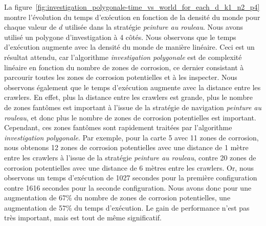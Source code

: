 \documentclass[english,RandD]{rapportPFE}  %
\begin{document}
			La figure~\ref{fig:investigation_polygonale-time_vs_world_for_each_d_k1_n2_p4} montre l'évolution du temps d'exécution en fonction de la densité du monde pour chaque valeur de $d$ utilisée dans la stratégie \textit{peinture au rouleau}.
			Nous avons utilisé un polygone d'investigation à 4 côtés.
			Nous observons que le temps d'exécution augmente avec la densité du monde de manière linéaire.
			Ceci est un résultat attendu, car l'algorithme \textit{investigation polygonale} est de complexité linéaire en fonction du nombre de zones de corrosion, ce dernier consistant à parcourir toutes les zones de corrosion potentielles et à les inspecter.
			Nous observons également que le temps d'exécution augmente avec la distance entre les crawlers.
			En effet, plus la distance entre les crawlers est grande, plus le nombre de zones fantômes est important à l'issue de la stratégie de navigation \textit{peinture au rouleau}, et donc plus le nombre de zones de corrosion potentielles est important.
			Cependant, ces zones fantômes sont rapidement traitées par l'algorithme \textit{investigation polygonale}.
			Par exemple, pour la carte 5 avec 11 zones de corrosion, nous obtenons 12 zones de corrosion potentielles avec une distance de 1 mètre entre les crawlers à l'issue de la stratégie \textit{peinture au rouleau}, contre 20 zones de corrosion potentielles avec une distance de 6 mètres entre les crawlers.
			Or, nous observons un temps d'exécution de 1027 secondes pour la première configuration contre 1616 secondes pour la seconde configuration.
			Nous avons donc pour une augmentation de 67\% du nombre de zones de corrosion potentielles, une augmentation de 57\% du temps d'exécution.
			Le gain de performance n'est pas très important, mais est tout de même significatif.
\end{document}

